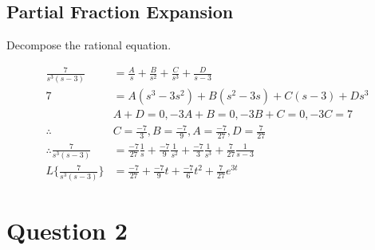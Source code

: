 \documentclass[12pt]{article}
\begin{document}
\subsection*{Partial Fraction Expansion}

Decompose the rational equation.

\begin{align*}
    \frac{7}{s^3(s-3)} &= \frac{A}{s} + \frac{B}{s^2} + \frac{C}{s^3} + \frac{D}{s-3}
    \\ 7 &= A(s^3 - 3s^2) + B(s^2 - 3s) + C(s - 3) + Ds^3
    \\ & A + D = 0, -3A + B = 0, -3B + C = 0, -3C = 7
    \\ \therefore &C = \frac{-7}{3}, B = \frac{-7}{9}, A = \frac{-7}{27}, D = \frac{7}{27}
    \\ \therefore \frac{7}{s^3(s-3)} &= \frac{-7}{27}\frac{1}{s} + \frac{-7}{9}\frac{1}{s^2} + \frac{-7}{3}\frac{1}{s^3} + \frac{7}{27}\frac{1}{s-3}
          \\ L\{\frac{7}{s^3(s-3)}\} &= \frac{-7}{27} + \frac{-7}{9}t + \frac{-7}{6}t^2 + \frac{7}{27}e^{3t}
\end{align*}

\section*{Question 2}
\end{document}
